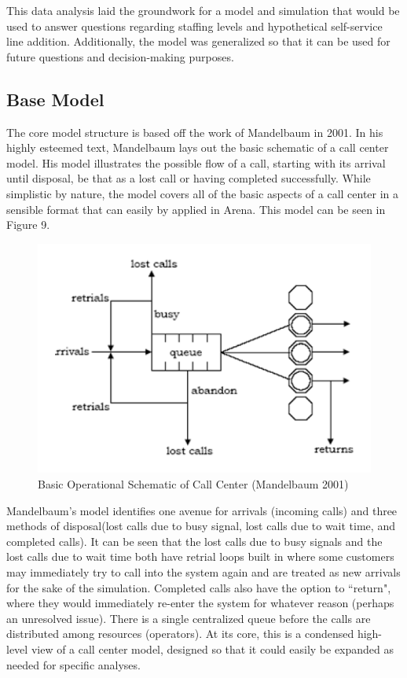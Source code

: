 \documentclass[12pt]{article}
\begin{document}
This data analysis laid the groundwork for a model and simulation that would be used to answer questions regarding staffing levels and hypothetical self-service line addition.  Additionally, the model was generalized so that it can be used for future questions and decision-making purposes.

	\subsection{Base Model}
The core model structure is based off the work of Mandelbaum in 2001\cite{mandelbaum}.  In his highly esteemed text, Mandelbaum lays out the basic schematic of a call center model.  His model illustrates the possible flow of a call, starting with its arrival until disposal, be that as a lost call or having completed successfully.  While simplistic by nature, the model covers all of the basic aspects of a call center in a sensible format that can easily by applied in Arena.  This model can be seen in Figure 9.  

	\begin{figure}[h]
	\includegraphics[scale=.45]{call_center_layout.png}
	\caption{Basic Operational Schematic of Call Center (Mandelbaum 2001)}
	\end{figure}

Mandelbaum's model identifies one avenue for arrivals (incoming calls) and three methods of disposal(lost calls due to busy signal, lost calls due to wait time, and completed calls).  It can be seen that the lost calls due to busy signals and the lost calls due to wait time both have retrial loops built in where some customers may immediately try to call into the system again and are treated as new arrivals for the sake of the simulation.  Completed calls also have the option to ``return", where they would immediately re-enter the system for whatever reason (perhaps an unresolved issue).  There is a single centralized queue before the calls are distributed among resources (operators).  At its core, this is a condensed high-level view of a call center model, designed so that it could easily be expanded as needed for specific analyses.
\end{document}
